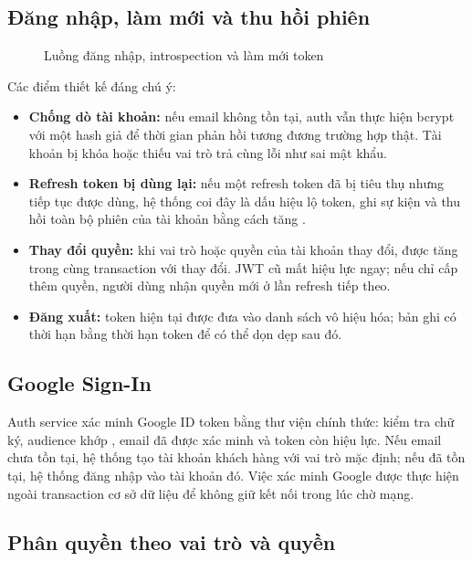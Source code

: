\subsection{Đăng nhập, làm mới và thu hồi phiên}

\begin{figure}[H]
\centering
\resizebox{\textwidth}{!}{}
\caption{Luồng đăng nhập, introspection và làm mới token}
\label{fig:sequence-auth}
\end{figure}

Các điểm thiết kế đáng chú ý:

\begin{itemize}
  \item \textbf{Chống dò tài khoản:} nếu email không tồn tại, auth vẫn thực hiện bcrypt với một hash giả để thời gian phản hồi tương đương trường hợp thật. Tài khoản bị khóa hoặc thiếu vai trò trả cùng lỗi  như sai mật khẩu.
  \item \textbf{Refresh token bị dùng lại:} nếu một refresh token đã bị tiêu thụ nhưng tiếp tục được dùng, hệ thống coi đây là dấu hiệu lộ token, ghi sự kiện  và thu hồi toàn bộ phiên của tài khoản bằng cách tăng .
  \item \textbf{Thay đổi quyền:} khi vai trò hoặc quyền của tài khoản thay đổi,  được tăng trong cùng transaction với thay đổi. JWT cũ mất hiệu lực ngay; nếu chỉ cấp thêm quyền, người dùng nhận quyền mới ở lần refresh tiếp theo.
  \item \textbf{Đăng xuất:} token hiện tại được đưa vào danh sách vô hiệu hóa; bản ghi có thời hạn bằng thời hạn token để có thể dọn dẹp sau đó.
\end{itemize}

\subsection{Google Sign-In}

Auth service xác minh Google ID token bằng thư viện chính thức: kiểm tra chữ ký, audience khớp , email đã được xác minh và token còn hiệu lực. Nếu email chưa tồn tại, hệ thống tạo tài khoản khách hàng với vai trò mặc định; nếu đã tồn tại, hệ thống đăng nhập vào tài khoản đó. Việc xác minh Google được thực hiện ngoài transaction cơ sở dữ liệu để không giữ kết nối trong lúc chờ mạng.

\subsection{Phân quyền theo vai trò và quyền}

